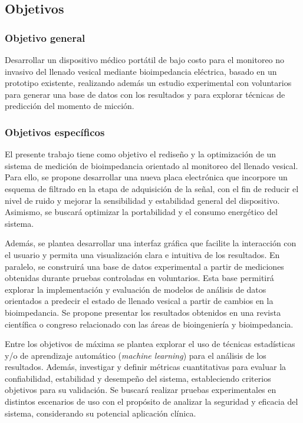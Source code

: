 \documentclass[12pt,a4paper]{article}
\begin{document}
\subsection{Objetivos}

\subsubsection{Objetivo general}

Desarrollar un dispositivo médico portátil de bajo costo para el monitoreo no invasivo del
llenado vesical mediante bioimpedancia eléctrica, basado en un prototipo existente, realizando 
además un estudio experimental con voluntarios para generar una base de datos con los resultados
y para explorar técnicas de predicción del momento de micción.


\subsubsection{Objetivos específicos}

El presente trabajo tiene como objetivo el rediseño y la optimización de un sistema de medición de
bioimpedancia orientado al monitoreo del llenado vesical. Para ello, se propone desarrollar una nueva
placa electrónica que incorpore un esquema de filtrado en la etapa de adquisición de la señal, con el
fin de reducir el nivel de ruido y mejorar la sensibilidad y estabilidad general del dispositivo.
Asimismo, se buscará optimizar la portabilidad y el consumo energético del sistema.

Además, se plantea desarrollar una interfaz gráfica que facilite la interacción con el usuario y
permita una visualización clara e intuitiva de los resultados. En paralelo, se construirá una base
de datos experimental a partir de mediciones obtenidas durante pruebas controladas en voluntarios. Esta base
permitirá explorar la implementación y evaluación de modelos de análisis de datos orientados a predecir 
el estado de llenado vesical a partir de cambios en la bioimpedancia. Se propone presentar los resultados 
obtenidos en una revista científica o congreso relacionado con las áreas de bioingeniería y bioimpedancia.

Entre los objetivos de máxima se plantea explorar el uso de técnicas estadísticas y/o de aprendizaje automático (\textit{machine
learning}) para el análisis de los resultados. Además, investigar y definir métricas cuantitativas para evaluar la
confiabilidad, estabilidad y desempeño del sistema, estableciendo criterios objetivos para su
validación. Se buscará realizar pruebas experimentales en distintos escenarios de uso con el propósito
de analizar la seguridad y eficacia del sistema, considerando su potencial aplicación clínica. 
\end{document}
